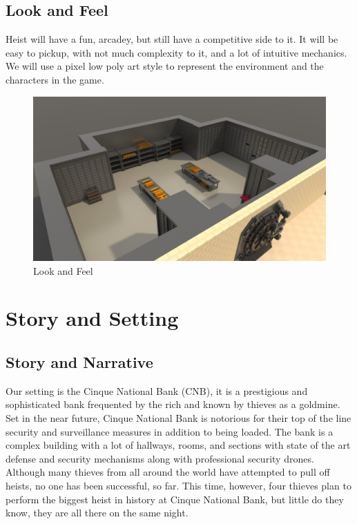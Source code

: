 \documentclass[14pt]{report}
\begin{document}
\section{Look and Feel}

Heist will have a fun, arcadey, but still have a competitive side to it. It will be easy to pickup, with not much complexity to it, and a lot of intuitive mechanics. We will use a pixel low poly art style to represent the environment and the characters in the game.

\begin{figure}[h!]
	\includegraphics[width=\linewidth]{images/lookandfeel.jpg}
	\caption{Look and Feel}
\end{figure}

\chapter{Story and Setting}

\section{Story and Narrative}

Our setting is the Cinque National Bank (CNB), it is a prestigious and sophisticated bank frequented by the rich and known by thieves as a goldmine. Set in the near future, Cinque National Bank is notorious for their top of the line security and surveillance measures in addition to being loaded.  The bank is a complex building with a lot of hallways, rooms, and sections with state of the art defense and security mechanisms along with professional security drones. Although many thieves from all around the world have attempted to pull off heists, no one has been successful, so far. This time, however, four thieves plan to perform the biggest heist in history at Cinque National Bank, but little do they know, they are all there on the same night.
\end{document}
